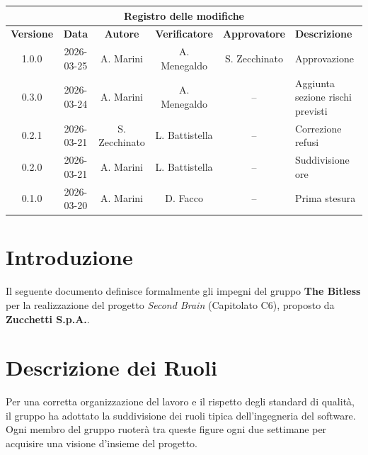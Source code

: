 \documentclass[a4paper, 10pt, colorlinks=true, linkcolor=black, urlcolor=blue, citecolor=blue, hidelinks]{article}
\begin{document}
\newcommand{\tipoverbale}{Dichiarazione degli Impegni}
\newcommand{\dataverbale}{2026-03-20}
\newcommand{\dataversione}{2026-03-24}
\newcommand{\versione}{1.0.0}
\newcommand{\stato}{Approvato}
\newcommand{\destinatari}{Prof. Tullio Vardanega, prof. Riccardo Cardin, The Bitless}


\newpage


\begin{center}
    \begin{tabularx}{\textwidth}{|c|c|c|c|c|>{\raggedright\arraybackslash}X|}
        \hline
        \multicolumn{6}{|c|}{\textbf{Registro delle modifiche}} \\
        \hline
        \textbf{Versione} & \textbf{Data} & \textbf{Autore} & \textbf{Verificatore} & \textbf{Approvatore} & \textbf{Descrizione} \\
        \hline
        1.0.0 & 2026-03-25 & A. Marini & A. Menegaldo & S. Zecchinato & Approvazione \\
        \hline
        0.3.0 & 2026-03-24 & A. Marini & A. Menegaldo & -- & Aggiunta sezione rischi previsti \\
        \hline
        0.2.1 & 2026-03-21 & S. Zecchinato & L. Battistella & -- & Correzione refusi \\
        \hline
        0.2.0 & 2026-03-21 & A. Marini & L. Battistella & -- & Suddivisione ore \\
        \hline
        0.1.0 & 2026-03-20 & A. Marini & D. Facco & -- & Prima stesura \\
        \hline
    \end{tabularx}
\end{center}

\newpage
\tableofcontents
{}
\newpage

\section{Introduzione}
Il seguente documento definisce formalmente gli impegni del gruppo \textbf{The Bitless} per la realizzazione del progetto \textit{Second Brain} (Capitolato C6), proposto da \textbf{Zucchetti S.p.A.}.

\section{Descrizione dei Ruoli}
Per una corretta organizzazione del lavoro e il rispetto degli standard di qualità, il gruppo ha adottato la suddivisione dei ruoli tipica dell'ingegneria del software. Ogni membro del gruppo ruoterà tra queste figure ogni due settimane per acquisire una visione d'insieme del progetto.
\end{document}

